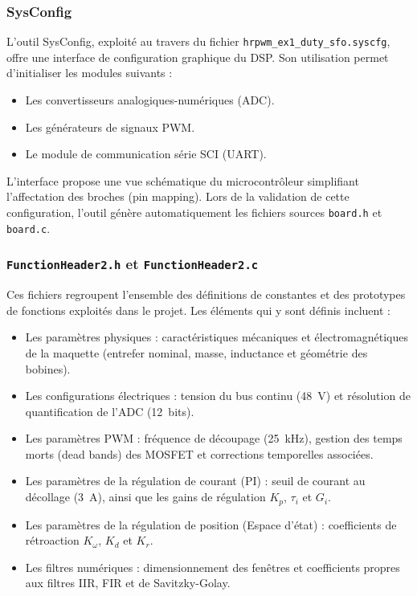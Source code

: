 \subsubsection{SysConfig}
\label{subsubsec:SysConfig}
L'outil SysConfig, exploité au travers du fichier \texttt{hrpwm\_ex1\_duty\_sfo.syscfg}, offre une interface de configuration graphique du DSP. Son utilisation permet d'initialiser les modules suivants :

\begin{itemize}
    \item Les convertisseurs analogiques-numériques (ADC).
    \item Les générateurs de signaux PWM.
    \item Le module de communication série SCI (UART).
\end{itemize}

L'interface propose une vue schématique du microcontrôleur simplifiant l'affectation des broches (pin mapping). Lors de la validation de cette configuration, l'outil génère automatiquement les fichiers sources \texttt{board.h} et \texttt{board.c}.

\subsubsection{\texttt{FunctionHeader2.h} et \texttt{FunctionHeader2.c}}
\label{subsubsec:FunctionHeader}
Ces fichiers regroupent l'ensemble des définitions de constantes et des prototypes de fonctions exploités dans le projet. Les éléments qui y sont définis incluent :

\begin{itemize}
    \item Les paramètres physiques : caractéristiques mécaniques et électromagnétiques de la maquette (entrefer nominal, masse, inductance et géométrie des bobines).
    \item Les configurations électriques : tension du bus continu (48~V) et résolution de quantification de l'ADC (12~bits).
    \item Les paramètres PWM : fréquence de découpage (25~kHz), gestion des temps morts (dead bands) des MOSFET et corrections temporelles associées.
    \item Les paramètres de la régulation de courant (PI) : seuil de courant au décollage (3~A), ainsi que les gains de régulation $K_p$, $\tau_i$ et $G_i$.
    \item Les paramètres de la régulation de position (Espace d'état) : coefficients de rétroaction $K_\omega$, $K_d$ et $K_r$.
    \item Les filtres numériques : dimensionnement des fenêtres et coefficients propres aux filtres IIR, FIR et de Savitzky-Golay.
\end{itemize}

